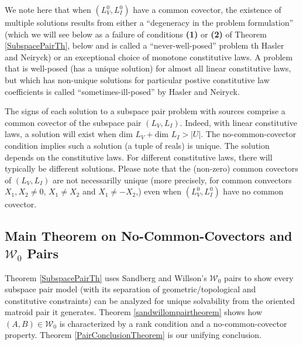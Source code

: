 \documentclass{amsproc-sunycstr}
\theoremstyle{plain}
\theoremstyle{definition}
\theoremstyle{remark}
\newcommand{\extra}[1]{{{#1}}}
\begin{document}
We note here that when $(L_V^0,L_I^0)$ have a common covector,
the existence of multiple solutions results from
either a ``degeneracy in the problem formulation''
(which we will see below as a failure of 
conditions \textbf{(1)} or \textbf{(2)} of Theorem \ref{SubspacePairTh},
below and is called a ``never-well-posed'' problem th Hasler and Neiryck)
or an exceptional choice of monotone constitutive laws.  A problem 
that is well-posed (has a unique solution) for almost all linear
constitutive laws, but which has non-unique solutions for particular
postive constitutive law coefficients is called 
``sometimes-ill-posed'' by Hasler and Neiryck.

The signs of each solution to a subspace pair problem with sources 
comprise a common covector of the subspace pair 
$(L_V,L_I)$.  Indeed, with linear constitutive laws, a solution 
will exist when $\mbox{dim\ } L_V+\mbox{dim\ } L_I> |U|$.  
The no-common-covector condition implies such a solution (a tuple of
reals) is unique.  The solution depends on the constitutive laws.
For different constitutive laws, there will typically be different
solutions.  Please note that the (non-zero) common covectors of
$(L_V,L_I)$ are not necessarilly unique (more precisely,
for common convectors $X_1,X_2\neq 0$, $X_1\neq X_2$ and $X_1\neq -X_2$,)
even when
$(L_V^0,L_I^0)$ have no common covector.




\subsection{Main Theorem on No-Common-Covectors and $\mathcal{W}_0$ Pairs}

Theorem \ref{SubspacePairTh} uses
Sandberg and Willson's 
$\mathcal{W}_0$ pairs
to show every 
subspace pair model 
\extra{(with  its separation of
geometric/topological and constitutive constraints)}
can be analyzed
for unique solvability from the oriented matroid pair it generates.
Theorem \ref{sandwillompairtheorem} shows how
$(A,B)\in\mathcal{W}_0$ is characterized by a rank condition and a 
no-common-covector property.  
Theorem \ref{PairConclusionTheorem} is our unifying conclusion.
\end{document}
